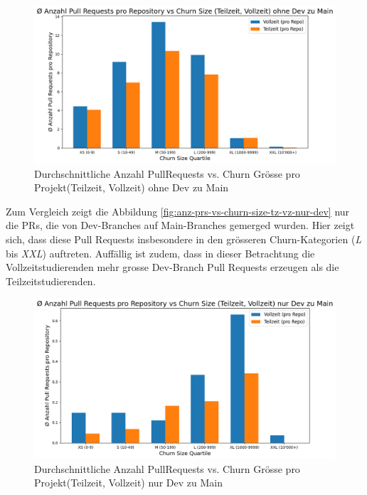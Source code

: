 \begin{figure}[htbp]
    \includegraphics[width=\textwidth]{Figures/avg-anz-prs-vs-churn-size-tz-vz-pro-repo-ohne-dev.png}
    \caption{Durchschnittliche Anzahl PullRequests vs. Churn Grösse pro Projekt(Teilzeit, Vollzeit) ohne Dev zu Main}
    \label{fig:anz-prs-vs-churn-size-tz-vz-ohne-dev}
\end{figure}

Zum Vergleich zeigt die Abbildung \autoref{fig:anz-prs-vs-churn-size-tz-vz-nur-dev} nur die PRs, die von Dev-Branches auf Main-Branches gemerged wurden. Hier zeigt sich, dass diese Pull Requests insbesondere in den grösseren Churn-Kategorien (\textit{L} bis \textit{XXL}) auftreten. Auffällig ist zudem, dass in dieser Betrachtung die Vollzeitstudierenden mehr grosse Dev-Branch Pull Requests erzeugen als die Teilzeitstudierenden.

\begin{figure}[htbp]
    \includegraphics[width=\textwidth]{Figures/avg-anz-prs-vs-churn-size-tz-vz-pro-repo-nur-dev.png}
    \caption{Durchschnittliche Anzahl PullRequests vs. Churn Grösse pro Projekt(Teilzeit, Vollzeit) nur Dev zu Main}
    \label{fig:anz-prs-vs-churn-size-tz-vz-nur-dev}
\end{figure}

